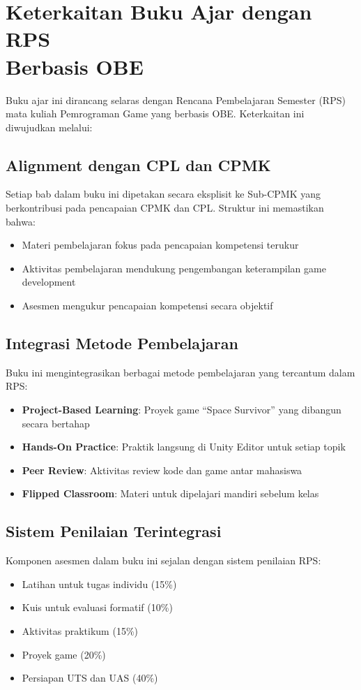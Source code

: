 \section[Keterkaitan Buku Ajar dengan RPS Berbasis OBE]{Keterkaitan Buku Ajar dengan RPS \protect\\ Berbasis OBE}

Buku ajar ini dirancang selaras dengan Rencana Pembelajaran Semester (RPS) mata kuliah Pemrograman Game yang berbasis OBE. Keterkaitan ini diwujudkan melalui:

\subsection{Alignment dengan CPL dan CPMK}

Setiap bab dalam buku ini dipetakan secara eksplisit ke Sub-CPMK yang berkontribusi pada pencapaian CPMK dan CPL. Struktur ini memastikan bahwa:
\begin{itemize}
  \item Materi pembelajaran fokus pada pencapaian kompetensi terukur
  \item Aktivitas pembelajaran mendukung pengembangan keterampilan game development
  \item Asesmen mengukur pencapaian kompetensi secara objektif
\end{itemize}

\subsection{Integrasi Metode Pembelajaran}

Buku ini mengintegrasikan berbagai metode pembelajaran yang tercantum dalam RPS:
\begin{itemize}
  \item \textbf{Project-Based Learning}: Proyek game ``Space Survivor'' yang dibangun secara bertahap
  \item \textbf{Hands-On Practice}: Praktik langsung di Unity Editor untuk setiap topik
  \item \textbf{Peer Review}: Aktivitas review kode dan game antar mahasiswa
  \item \textbf{Flipped Classroom}: Materi untuk dipelajari mandiri sebelum kelas
\end{itemize}

\subsection{Sistem Penilaian Terintegrasi}

Komponen asesmen dalam buku ini sejalan dengan sistem penilaian RPS:
\begin{itemize}
  \item Latihan untuk tugas individu (15\%)
  \item Kuis untuk evaluasi formatif (10\%)
  \item Aktivitas praktikum (15\%)
  \item Proyek game (20\%)
  \item Persiapan UTS dan UAS (40\%)
\end{itemize}
